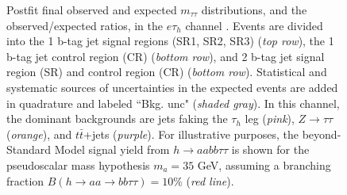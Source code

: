 \begin{figure}[ht]
\begin{center}
    \end{center}
    \caption[Postfit final observed and expected $m_{\tau\tau}$ distributions in the $e\tau_{h}$ channel, for the 1 b-tag jet and 2 b-tag jet signal and control regions.]{Postfit final observed and expected $m_{\tau\tau}$ distributions, and the observed/expected ratios, in the $e\tau_{h}$ channel \cite{CMS-AN-20-213}. Events are divided into the 1 b-tag jet signal regions (SR1, SR2, SR3) (\textit{top row}), the 1 b-tag jet control region (CR) (\textit{bottom row}), and 2 b-tag jet signal region (SR) and control region (CR) (\textit{bottom row}). Statistical and systematic sources of uncertainties in the expected events are added in quadrature and labeled ``Bkg. unc" (\textit{shaded gray}). In this channel, the dominant backgrounds are jets faking the $\tau_{h}$ leg (\textit{pink}), $Z \rightarrow \tau\tau$ (\textit{orange}), and $t\bar{t}$+jets (\textit{purple}). For illustrative purposes, the beyond-Standard Model signal yield from $h\rightarrow aa bb\tau\tau$ is shown for the pseudoscalar mass hypothesis $m_a = 35$ GeV, assuming a branching fraction $B(h \rightarrow aa \rightarrow bb\tau\tau) = 10\%$ (\textit{red line}).}
    \label{fig:results_mtt_postfit_etall}
\end{figure}

